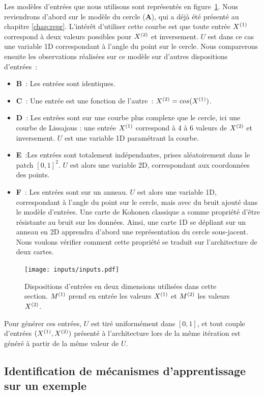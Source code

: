\documentclass[../main]{subfiles}
\begin{document}
Les modèles d'entrées que nous utilisons sont représentés en figure~\ref{fig:input_list}.
Nous reviendrons d'abord sur le modèle du cercle (\textbf{A}), qui a déjà été présenté au chapitre \ref{chap:repr}. L'intérêt d'utiliser cette courbe est que toute entrée $X^{({1})}$ correspond à deux valeurs possibles pour $X^{({2})}$ et inversement. $U$ est dans ce cas une variable 1D correspondant à l'angle du point sur le cercle.
Nous comparerons ensuite les observations réalisées sur ce modèle sur d'autres dispositions d'entrées~:
\begin{itemize}
	\item \textbf{B}~: Les entrées sont identiques.
	\item \textbf{C}~: Une entrée est une fonction de l'autre~: $X^{({2})} = cos(X^{({1})})$.
	\item \textbf{D}~: Les entrées sont sur une courbe plus complexe que le cercle, ici une courbe de Lissajous : une entrée $X^{({1})}$ correspond à 4 à 6 valeurs de $X^{({2})}$ et inversement. $U$ est une variable 1D paramétrant la courbe.
	\item \textbf{E}~:Les entrées sont totalement indépendantes, prises aléatoirement dans le patch $[0,1]^2$. $U$ est alors une variable 2D, correspondant aux coordonnées des points.
	\item \textbf{F}~: Les entrées sont sur un anneau. $U$ est alors une variable 1D, correspondant à l'angle du point sur le cercle, mais avec du bruit ajouté dans le modèle d'entrées. 
	Une carte de Kohonen classique a comme propriété d'être résistante au bruit sur les données. Ainsi, une carte 1D se dépliant sur un anneau en 2D apprendra d'abord une représentation du cercle sous-jacent. Nous voulons vérifier comment cette propriété se traduit sur l'architecture de deux cartes.
\end{itemize}

\begin{figure}
	\texttt{[image: inputs/inputs.pdf]}
	\caption{Dispositions d'entrées en deux dimensions utilisées dans cette section. $M^{({1})}$ prend en entrée les valeurs $X^{({1})}$ et $M^{({2})}$ les valeurs $X^{({2})}$. \label{fig:input_list}}
\end{figure}

Pour générer ces entrées, $U$ est tiré uniformément dans $[0,1]$, et tout couple d'entrées $(X^{({1})},X^{({2})})$ présenté à l'architecture lors de la même itération est généré à partir de la même valeur de $U$.

\subsection{Identification de mécanismes d'apprentissage sur un exemple}\label{sec:2som_cercle}
\end{document}
